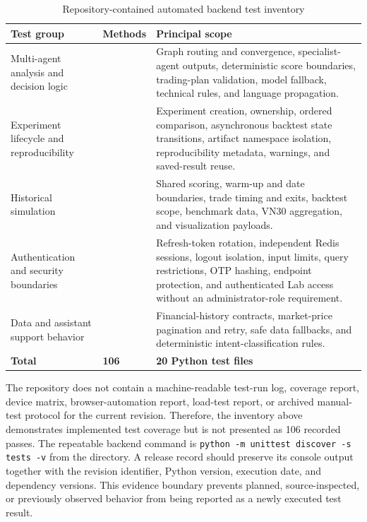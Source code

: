 \begin{table}[H]
    \centering
    \caption{Repository-contained automated backend test inventory}
    \label{tab:automated-test-inventory}
    \small
    \setlength{\tabcolsep}{5pt}
    \renewcommand{\arraystretch}{1.18}
    \begin{tabularx}{\textwidth}{>{\raggedright\arraybackslash}p{4.0cm} >{\centering\arraybackslash}p{1.5cm} X}
        \toprule
        \textbf{Test group} & \textbf{Methods} & \textbf{Principal scope} \\
        \midrule
        Multi-agent analysis and decision logic & 49 & Graph routing and convergence, specialist-agent outputs, deterministic score boundaries, trading-plan validation, model fallback, technical rules, and language propagation. \\
        \addlinespace
        Experiment lifecycle and reproducibility & 19 & Experiment creation, ownership, ordered comparison, asynchronous backtest state transitions, artifact namespace isolation, reproducibility metadata, warnings, and saved-result reuse. \\
        \addlinespace
        Historical simulation & 14 & Shared scoring, warm-up and date boundaries, trade timing and exits, backtest scope, benchmark data, VN30 aggregation, and visualization payloads. \\
        \addlinespace
        Authentication and security boundaries & 13 & Refresh-token rotation, independent Redis sessions, logout isolation, input limits, query restrictions, OTP hashing, endpoint protection, and authenticated Lab access without an administrator-role requirement. \\
        \addlinespace
        Data and assistant support behavior & 11 & Financial-history contracts, market-price pagination and retry, safe data fallbacks, and deterministic intent-classification rules. \\
        \midrule
        \textbf{Total} & \textbf{106} & \textbf{20 Python test files} \\
        \bottomrule
    \end{tabularx}
\end{table}

The repository does not contain a machine-readable test-run log, coverage report, device matrix, browser-automation report, load-test report, or archived manual-test protocol for the current revision. Therefore, the inventory above demonstrates implemented test coverage but is not presented as 106 recorded passes. The repeatable backend command is \texttt{python -m unittest discover -s tests -v} from the  directory. A release record should preserve its console output together with the revision identifier, Python version, execution date, and dependency versions. This evidence boundary prevents planned, source-inspected, or previously observed behavior from being reported as a newly executed test result.

